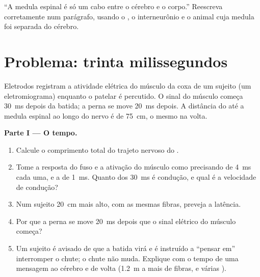 \begin{exercise}[$\star\star\star$]\label{exo:g12:stretch-reflex:15}
``A medula espinal é só um cabo entre o cérebro e o corpo.'' Reescreva
corretamente num parágrafo, usando o , o interneurônio e o
animal cuja medula foi separada do cérebro.
\end{exercise}

\section{Problema: trinta milissegundos}

\begin{problem}
\label{pb:g12:stretch-reflex:1}
Eletrodos registram a atividade elétrica do músculo da coxa de um
sujeito (um eletromiograma) enquanto o  patelar é percutido. O
sinal do músculo começa \qty{30}{ms} depois da batida; a perna se move
\qty{20}{ms} depois. A distância do  até a medula espinal ao
longo do nervo é de \qty{75}{cm}, o mesmo na volta.

\medskip
\noindent\textbf{Parte I --- O tempo.}
\begin{enumerate}
  \item Calcule o comprimento total do trajeto nervoso do .
  \item Tome a resposta do fuso e a ativação do músculo como
        precisando de \qty{4}{ms} cada uma, e a  de \qty{1}{ms}.
        Quanto dos \qty{30}{ms} é condução, e qual é a velocidade de
        condução?
  \item Num sujeito \qty{20}{cm} mais alto, com as mesmas fibras,
        preveja a latência.
  \item Por que a perna se move \qty{20}{ms} depois que o sinal
        elétrico do músculo começa?
  \item Um sujeito é avisado de que a batida virá e é instruído a
        ``pensar em'' interromper o chute; o chute não muda. Explique
        com o tempo de uma mensagem ao cérebro e de volta
        (\qty{1.2}{m} a mais de fibras, e várias ).
\end{enumerate}


\end{problem}
